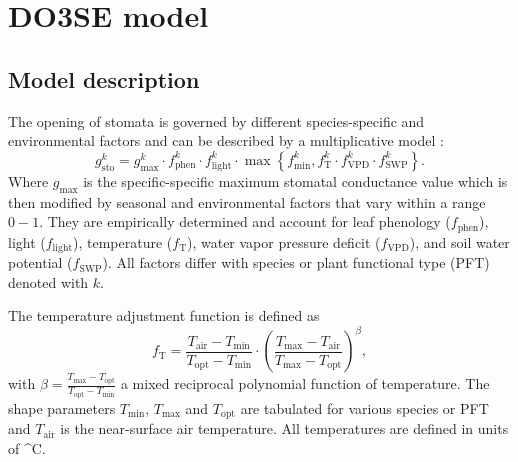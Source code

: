 \documentclass[bg, manuscript]{copernicus}
\begin{document}

\clearpage

\section{DO3SE model}
\label{appendix:do3se_model}

\subsection{Model description}
\label{subsec:model_describtion}
The opening of stomata is governed by different species-specific and environmental factors and can be described by a multiplicative model \citep{PTRS:Jarvis1976,Emberson2000,ICP:MappingManual2017}:
\begin{equation}
  g^k_\text{sto} = g^k_\text{max} \cdot f^k_\text{phen} \cdot f^k_\text{light} \cdot \max{\left\{f^k_\text{min}, f^k_\mathrm{T} \cdot f^k_\mathrm{VPD} \cdot f^k_\text{SWP}\right\}}.
  \label{eq:stomatal}
\end{equation}
%
Where $g_\mathrm{max}$ is the specific-specific maximum stomatal conductance value which is then modified by seasonal and environmental factors that vary within a range $0-1$. They are empirically determined and account for leaf phenology ($f_\text{phen}$), light ($f_\text{light}$), temperature ($f_\mathrm{T}$), water vapor pressure deficit ($f_\mathrm{VPD}$), and soil water potential ($f_\text{SWP}$). All factors differ with species or plant functional type (PFT) denoted with $k$.

The temperature adjustment function is defined as
%
\begin{equation}
  f_\mathrm{T} = \frac{T_\text{air}-T_\text{min}}{T_\text{opt}-T_\text{min}} \cdot \left(\frac{T_{\text{max}}-T_\text{air}}{T_{\text{max}}-T_\text{opt}}\right)^\beta,
  \label{eq:f_temp}
\end{equation}
with $\beta = \frac{T_\text{max}-T_\text{opt}}{T_\text{opt}-T_\text{min}}$ a mixed reciprocal polynomial function of temperature. The shape parameters $T_\text{min}$, $T_\text{max}$ and $T_\text{opt}$ are tabulated for various species or PFT and $T_\mathrm{air}$ is the near-surface air temperature. All temperatures are defined in units of \unit{^\circ C}.
\end{document}
